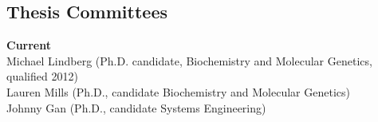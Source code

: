 \documentclass[margin,line]{cv}
\begin{document}
\begin{resume}
    
        
    \section{\mysidestyle Thesis Committees}
    \textbf{Current} \\
    Michael Lindberg (Ph.D. candidate, Biochemistry and Molecular Genetics, qualified 2012)\\
    Lauren Mills (Ph.D., candidate Biochemistry and Molecular Genetics)\\
	Johnny Gan (Ph.D., candidate Systems Engineering)
    
    

\end{resume}
\end{document}
